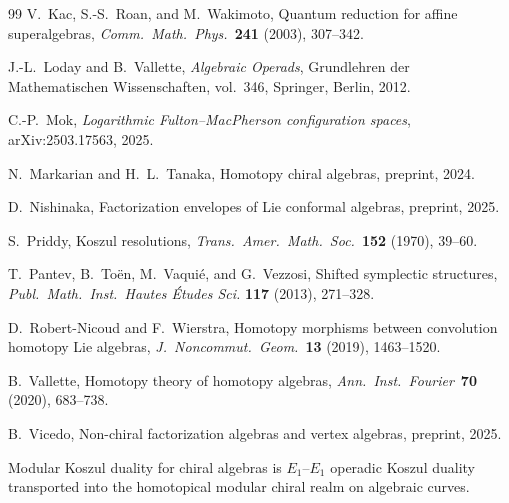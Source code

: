 \documentclass[11pt,reqno]{amsart}
\theoremstyle{definition}
\theoremstyle{remark}
\numberwithin{equation}{section}
\begin{document}
\begin{thebibliography}{99}
V.~Kac, S.-S.~Roan, and M.~Wakimoto,
Quantum reduction for affine superalgebras,
\textit{Comm.\ Math.\ Phys.}~\textbf{241} (2003),
307--342.

J.-L.~Loday and B.~Vallette,
\textit{Algebraic Operads},
Grundlehren der Mathematischen Wissenschaften,
vol.~346, Springer, Berlin, 2012.

C.-P.~Mok,
\emph{Logarithmic Fulton--MacPherson configuration spaces},
arXiv:2503.17563, 2025.

N.~Markarian and H.~L.~Tanaka,
Homotopy chiral algebras,
preprint, 2024.

D.~Nishinaka,
Factorization envelopes of Lie conformal algebras,
preprint, 2025.

S.~Priddy,
Koszul resolutions,
\textit{Trans.\ Amer.\ Math.\ Soc.}~\textbf{152}
(1970), 39--60.

T.~Pantev, B.~To\"en, M.~Vaqui\'e, and G.~Vezzosi,
Shifted symplectic structures,
\textit{Publ.\ Math.\ Inst.\ Hautes \'Etudes Sci.}
\textbf{117} (2013), 271--328.

D.~Robert-Nicoud and F.~Wierstra,
Homotopy morphisms between convolution homotopy
Lie algebras,
\textit{J.\ Noncommut.\ Geom.}~\textbf{13} (2019),
1463--1520.

B.~Vallette,
Homotopy theory of homotopy algebras,
\textit{Ann.\ Inst.\ Fourier}~\textbf{70} (2020),
683--738.

B.~Vicedo,
Non-chiral factorization algebras and vertex algebras,
preprint, 2025.

\end{thebibliography}

\bigskip
\noindent\hrulefill

\medskip
\noindent
Modular Koszul duality for chiral algebras is $E_1$--$E_1$
operadic Koszul duality transported into the homotopical
modular chiral realm on algebraic curves.
\end{document}
